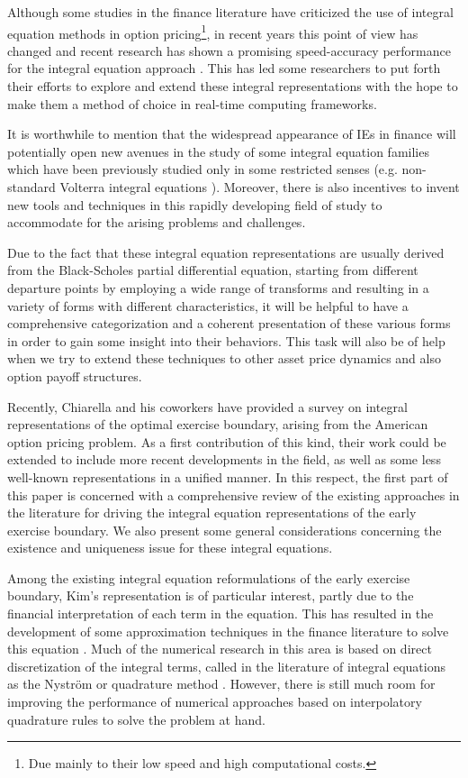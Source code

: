 \documentclass[fleqn,final,3p,11pt]{elsarticle}
\theoremstyle{definition}
\theoremstyle{remark}
\numberwithin{equation}{section}
\begin{document}
Although some studies in the finance literature have criticized the use of integral equation methods in option pricing\footnote{Due mainly to their low speed and high computational costs.}, in recent years this point of view has changed and recent research has shown a promising speed-accuracy performance for the integral equation approach \cite{andersen}. This has led some researchers to put forth their efforts to explore and extend these integral representations with the hope to make them a method of choice in real-time computing frameworks.

It is worthwhile to mention that the widespread appearance of IEs in finance will potentially open new avenues in the study of some integral equation families which have been previously studied only in some restricted senses (e.g. non-standard Volterra integral equations \cite{brunner, guan}). Moreover, there is also incentives to invent new tools and techniques in this rapidly developing field of study to accommodate for the arising problems and challenges.

Due to the fact that these integral equation representations are usually derived from the Black-Scholes partial differential equation, starting from different departure points by employing a wide range of transforms and resulting in a variety of forms with different characteristics, it will be helpful to have a comprehensive categorization and a coherent presentation of these various forms in order to gain some insight into their behaviors. This task will also be of help when we try to extend these techniques to other asset price dynamics and also option payoff structures.

Recently, Chiarella and his coworkers \cite{chiarella2014numerical, chia} have provided a survey on integral representations of the optimal exercise boundary, arising from the American option pricing problem. As a first contribution of this kind, their work could be extended to include more recent developments in the field, as well as some less well-known representations in a unified manner. In this respect, the first part of this paper is concerned with a comprehensive review of the existing approaches in the literature for driving the integral equation representations of the early exercise boundary. We also present some general considerations concerning the existence and uniqueness issue for these integral equations.

Among the existing integral equation reformulations of the early exercise boundary, Kim's representation \cite{kim} is of particular interest, partly due to the financial interpretation of each term in the equation. This has resulted in the development of some approximation techniques in the finance literature to solve this equation \cite{lai2, ju, kallast}. Much of the numerical research in this area is based on direct discretization of the integral terms, called in the literature of integral equations as the Nystr\"{o}m \cite{atkinson} or quadrature method \cite{hack}. However, there is still much room for improving the performance of numerical approaches based on interpolatory quadrature rules to solve the problem at hand.
\end{document}
